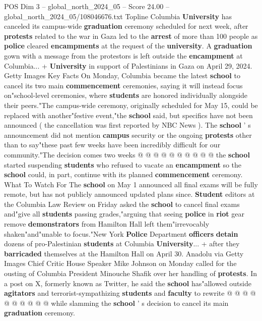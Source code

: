 \begin{textsample}{POS Dim 3 – global\_north\_2024\_05 – Score 24.00 – global\_north\_2024\_05/108046676.txt}  \label{ex:f3_pos_003}
Topline Columbia \textbf{University} has canceled its campus-wide \textbf{graduation} ceremony scheduled for next week, after \textbf{protests} related to the war in Gaza led to the \textbf{arrest} of more than 100 people as \textbf{police} cleared \textbf{encampments} at the request of the \textbf{university}.
A \textbf{graduation} gown with a message from the protestors is left outside the \textbf{encampment} at Columbia... + \textbf{University} in support of Palestinians in Gaza on April 29, 2024.
Getty Images Key Facts On Monday, Columbia became the latest \textbf{school} to cancel its two main \textbf{commencement} ceremonies, saying it will instead focus on"school-level ceremonies, where \textbf{students} are honored individually alongside their peers."The campus-wide ceremony, originally scheduled for May 15, could be replaced with another"festive event,"the \textbf{school} said, but specifics have not been announced ( the cancellation was first reported by NBC News ).
The \textbf{school} ' s announcement did not mention \textbf{campus} security or the ongoing \textbf{protests} other than to say"these past few weeks have been incredibly difficult for our community."The decision comes two weeks @ @ @ @ @ @ @ @ @ @ the \textbf{school} started suspending \textbf{students} who refused to vacate an \textbf{encampment} so the \textbf{school} could, in part, continue with its planned \textbf{commencement} ceremony.
What To Watch For The \textbf{school} on May 1 announced all final exams will be fully remote, but has not publicly announced updated plans since. \textbf{Student} editors at the Columbia Law Review on Friday asked the \textbf{school} to cancel final exams and"give all \textbf{students} passing grades,"arguing that seeing \textbf{police} in \textbf{riot} gear remove \textbf{demonstrators} from Hamilton Hall left them"irrevocably shaken"and"unable to focus."New York \textbf{Police} Department \textbf{officers} \textbf{detain} dozens of pro-Palestinian \textbf{students} at Columbia \textbf{University}... + after they \textbf{barricaded} themselves at the Hamilton Hall on April 30.
Anadolu via Getty Images Chief Critic House Speaker Mike Johnson on Monday called for the ousting of Columbia President Minouche Shafik over her handling of \textbf{protests}.
In a post on X, formerly known as Twitter, he said the \textbf{school} has"allowed outside \textbf{agitators} and terrorist-sympathizing \textbf{students} and \textbf{faculty} to rewrite @ @ @ @ @ @ @ @ @ @ while slamming the \textbf{school} ' s decision to cancel its main \textbf{graduation} ceremony.

\end{textsample}
